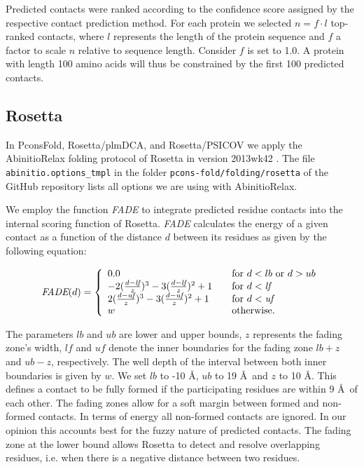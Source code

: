 \documentclass{bioinfo}
\begin{document}
\begin{methods}
Predicted contacts were ranked according to the confidence score
assigned by the respective contact prediction method. For each protein
we selected $n = f \cdot l$ top-ranked contacts, where $l$ represents
the length of the protein sequence and $f$ a factor to scale $n$
relative to sequence length. {\color{red} Consider $f$ is set to 1.0.
A protein with length 100 amino acids will thus be constrained by the
first 100 predicted contacts.}



\subsection{Rosetta}
In PconsFold, Rosetta/plmDCA, and Rosetta/PSICOV we apply the
AbinitioRelax folding protocol \cite[]{rohl_protein_2004} of Rosetta
in version 2013wk42 \cite[]{leaver-fay_rosetta3:_2011}. The file {\tt
 abinitio.options\_tmpl} in the folder {\tt pcons-fold/folding/rosetta} of the GitHub
repository lists all options we are using with AbinitioRelax. 

We employ the function \emph{FADE} to integrate predicted residue
contacts into the internal scoring function of Rosetta. \emph{FADE}
calculates the energy of a given contact as a function of the distance
$d$ between its residues as given by the following equation:

\begin{equation}%
\textit{FADE}(d) = \left\{
\begin{array}{l l l}\label{eq:fade}
0.0 & \quad \textrm{for $d < lb$ or $d > ub$} \\
-2(\frac{d - \textit{lf}}{z})^3 - 3(\frac{d - \textit{lf}}{z})^2 + 1 & \quad \textrm{for $d < \textit{lf}$} \\
2(\frac{d - \textit{uf}}{z})^3 - 3(\frac{d - \textit{uf}}{z})^2 + 1 & \quad \textrm{for $d < \textit{uf}$} \\
w & \quad \textrm{otherwise.} \\
\end{array} \right.
\end{equation}

The parameters $lb$ and $ub$ are lower and upper bounds, $z$
represents the fading zone's width, $\textit{lf}$ and $\textit{uf}$
denote the inner boundaries for the fading zone $lb + z$ and $ub - z$,
respectively. The well depth of the interval between both inner
boundaries is given by $w$. We set $lb$ to -10 \AA, $ub$ to 19 \AA\
and $z$ to 10 \AA. This defines a contact to be fully formed if the
participating residues are within 9 \AA\ of each other. The fading
zones allow for a soft margin between formed and non-formed
contacts. In terms of energy all non-formed contacts are ignored. In
our opinion this accounts best for the fuzzy nature of predicted
contacts. The fading zone at the lower bound allows Rosetta to detect
and resolve overlapping residues, i.e. when there is a negative
distance between two residues. 



\end{methods}
\end{document}

